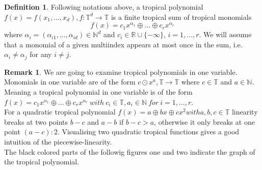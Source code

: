 \documentclass{article}
\theoremstyle{definition}
\newtheorem{definition}[theorem]{Definition}
\newtheorem{remark}[theorem]{Remark}
\begin{document}
\begin{definition}\label{tropPolyn}
\cite[p.~2]{zhang2018tropical}
Following notations above, a tropical polynomial $f(x)=f(x_1, \dots , x_d), f: \mathbb{T}^{d} \to \mathbb{T}$ is a finite tropical sum of tropical monomials 
$$ f(x)=c_1x^{\alpha_1} \oplus \dots \oplus c_rx^{\alpha_r}$$
where $\alpha_i = (\alpha_{i1}, \dots , \alpha_{id}) \in \mathbb{N}^{d}$ and $c_i \in \mathbb{R} \cup \{- \infty \}$, $i = 1, \dots , r$. We will assume that a monomial of a given multiindex appears at most once in the sum, i.e. $\alpha_i \neq \alpha_j$ for any $i \neq j$.
\end{definition}

\begin{remark}
We are going to examine tropical polynomials in one variable. Monomials in one variable are of the form $ c \odot x^{a}, \mathbb{T} \to \mathbb{T}$ where $c \in \mathbb{T}$ and $ a \in \mathbb{N} $. Meaning a tropical polynomial in one variable is of the form $f(x)=c_1x^{\alpha_1} \oplus \dots \oplus c_rx^{\alpha_r} \ with \ c_i \in \mathbb{T}, a_i \in \mathbb{N} \ for \ i=1, \dots , r$. \\
For a quadratic tropical polynomial $f(x) = a \oplus bx \oplus cx^{2} with a,b,c \in \mathbb{T}$ linearity breaks at two points $b-c$ and $a-b$ if $b-c > a$, otherwise it only breaks at one point $(a-c):2$. Visualising two quadratic tropical functions gives a good intuition of the piecewise-linearity. \\
The black colored parts of the followig figures one and two indicate the graph of the tropical polynomial.

\begin{figure}[h]


\end{figure}
\end{remark}
\end{document}
